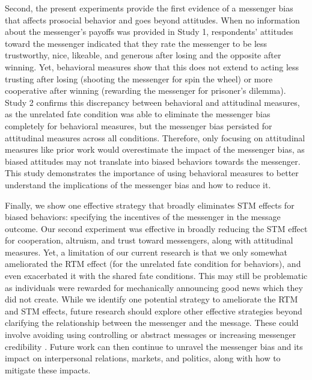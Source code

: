 Second, the present experiments provide the first evidence of a
messenger bias that affects prosocial behavior and goes beyond
attitudes. When no information about the messenger's payoffs was
provided in Study 1, respondents' attitudes toward the messenger
indicated that they rate the messenger to be less trustworthy, nice,
likeable, and generous after losing and the opposite after winning. Yet,
behavioral measures show that this does not extend to acting less
trusting after losing (shooting the messenger for spin the wheel) or
more cooperative after winning (rewarding the messenger for prisoner's
dilemma). Study 2 confirms this discrepancy between behavioral and
attitudinal measures, as the unrelated fate condition was able to
eliminate the messenger bias completely for behavioral measures, but the
messenger bias persisted for attitudinal measures across all conditions.
Therefore, only focusing on attitudinal measures like prior work would
overestimate the impact of the messenger bias, as biased attitudes may
not translate into biased behaviors towards the messenger. This study
demonstrates the importance of using behavioral measures to better
understand the implications of the messenger bias and how to reduce it.

Finally, we show one effective strategy that broadly eliminates STM
effects for biased behaviors: specifying the incentives of the messenger
in the message outcome. Our second experiment was effective in broadly
reducing the STM effect for cooperation, altruism, and trust toward
messengers, along with attitudinal measures. Yet, a limitation of our
current research is that we only somewhat ameliorated the RTM effect (for the unrelated fate condition for behaviors), and even
exacerbated it with the shared fate conditions. This may still be
problematic as individuals were rewarded for mechanically announcing
good news which they did not create. While we identify one potential
strategy to ameliorate the RTM and STM effects, future research should
explore other effective strategies beyond clarifying the relationship
between the messenger and the message. These could involve avoiding using
controlling or abstract messages \citep[see, e.g.,][]{sparks2008style,miller2007psychological} or increasing messenger credibility \citep[see, e.g.,][]{hunt1984role,kamins1987twosided}. 
Future work can then
continue to unravel the messenger bias and its impact on interpersonal
relations, markets, and politics, along with how to mitigate these
impacts.
